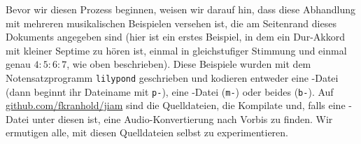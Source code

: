 
\noindent Bevor wir diesen Prozess beginnen, weisen wir darauf hin, dass diese
Abhandlung mit mehreren musikalischen Beispielen versehen ist, die am Seitenrand
dieses Dokuments angegeben sind (hier ist ein erstes Beispiel, in dem
ein Dur-Akkord mit kleiner Septime zu hören ist, einmal in gleichstufiger
Stimmung und einmal genau $4:5:6:7$, wie oben beschrieben). Diese Beispiele
wurden mit dem Notensatzprogramm \verb!lilypond! geschrieben und kodieren
entweder eine -Datei (dann beginnt ihr Dateiname mit \verb!p-!), eine
-Datei (\verb!m-!) oder beides (\verb!b-!). Auf
\href{https://github.com/fkranhold/jiam/}{\textsf{github.com/fkranhold/jiam}}
sind die Quelldateien, die Kompilate und, falls eine -Datei unter
diesen ist, eine Audio-Konvertierung nach  Vorbis zu finden. Wir
ermutigen alle, mit diesen Quelldateien selbst zu experimentieren.

